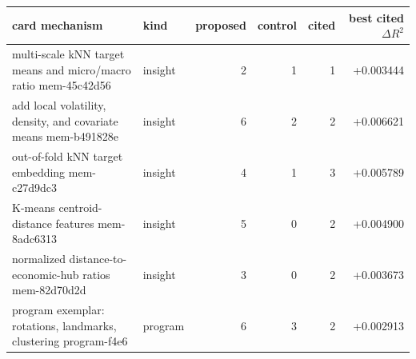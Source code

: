 \begin{tabular}{p{5.1cm}lrrrr}
\toprule
card mechanism & kind & proposed & control & cited & best cited $\Delta R^2$ \\
\midrule
multi-scale kNN target means and micro/macro ratio \newline \scriptsize{mem-45c42d56} & insight & 2 & 1 & 1 & +0.003444 \\
add local volatility, density, and covariate means \newline \scriptsize{mem-b491828e} & insight & 6 & 2 & 2 & +0.006621 \\
out-of-fold kNN target embedding \newline \scriptsize{mem-c27d9dc3} & insight & 4 & 1 & 3 & +0.005789 \\
K-means centroid-distance features \newline \scriptsize{mem-8adc6313} & insight & 5 & 0 & 2 & +0.004900 \\
normalized distance-to-economic-hub ratios \newline \scriptsize{mem-82d70d2d} & insight & 3 & 0 & 2 & +0.003673 \\
program exemplar: rotations, landmarks, clustering \newline \scriptsize{program-f4e6} & program & 6 & 3 & 2 & +0.002913 \\
\bottomrule
\end{tabular}
